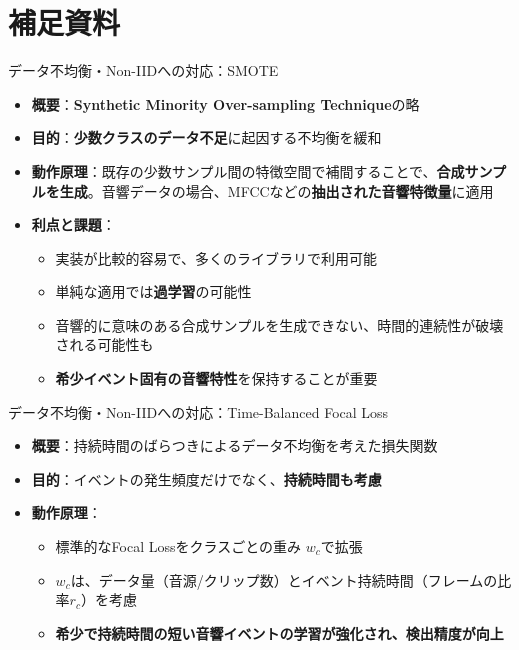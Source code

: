 \documentclass[unicode,12pt,aspectratio=169,dvipdfmx]{beamer}
\begin{document}
\section{補足資料}
\begin{frame}{データ不均衡・Non-IIDへの対応：SMOTE}
\begin{itemize}
    \item \textbf{概要}：\textbf{Synthetic Minority Over-sampling Technique}の略
    \item \textbf{目的}：\textbf{少数クラスのデータ不足}に起因する不均衡を緩和
    \item \textbf{動作原理}：既存の少数サンプル間の特徴空間で補間することで、\textbf{合成サンプルを生成}。音響データの場合、MFCCなどの\textbf{抽出された音響特徴量}に適用
    \item \textbf{利点と課題}：
    \begin{itemize}
        \item 実装が比較的容易で、多くのライブラリで利用可能
        \item 単純な適用では\textbf{過学習}の可能性
        \item 音響的に意味のある合成サンプルを生成できない、時間的連続性が破壊される可能性も
        \item \textbf{希少イベント固有の音響特性}を保持することが重要
    \end{itemize}
\end{itemize}
\end{frame}

\begin{frame}{データ不均衡・Non-IIDへの対応：Time-Balanced Focal Loss}
\begin{itemize}
    \item \textbf{概要}：持続時間のばらつきによるデータ不均衡を考えた損失関数
    \item \textbf{目的}：イベントの発生頻度だけでなく、\textbf{持続時間も考慮}
    \item \textbf{動作原理}：
    \begin{itemize}
        \item 標準的なFocal Lossをクラスごとの重み $w_c$で拡張
        \item $w_c$は、データ量（音源/クリップ数）とイベント持続時間（フレームの比率$r_c$）を考慮
        \item \textbf{希少で持続時間の短い音響イベントの学習が強化され、検出精度が向上}
    \end{itemize}
\end{itemize}
\end{frame}
\end{document}
